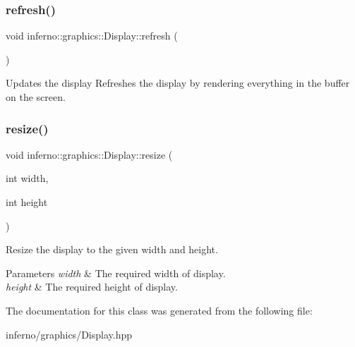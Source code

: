 \subsubsection{\texorpdfstring{refresh()}{refresh()}}
{\footnotesize\ttfamily void inferno\+::graphics\+::\+Display\+::refresh (\begin{DoxyParamCaption}{ }\end{DoxyParamCaption})\hspace{0.3cm}{\ttfamily [inline]}}



Updates the display Refreshes the display by rendering everything in the buffer on the screen. 

\mbox{\label{classinferno_1_1graphics_1_1_display_a8344f8d17d3706be8151e2c3104a8f4f}} 
\subsubsection{\texorpdfstring{resize()}{resize()}}
{\footnotesize\ttfamily void inferno\+::graphics\+::\+Display\+::resize (\begin{DoxyParamCaption}\item[{int}]{width,  }\item[{int}]{height }\end{DoxyParamCaption})\hspace{0.3cm}{\ttfamily [inline]}}



Resize the display to the given width and height. 


\begin{DoxyParams}{Parameters}
{\em width} & The required width of display. \\
\hline
{\em height} & The required height of display. \\
\hline
\end{DoxyParams}


The documentation for this class was generated from the following file\+:\begin{DoxyCompactItemize}
\item 
inferno/graphics/Display.\+hpp\end{DoxyCompactItemize}
